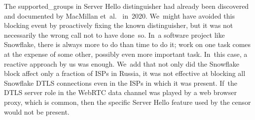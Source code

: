 \documentclass[letterpaper,twocolumn]{article}
\begin{document}
The \mbox{supported\_groups} in Server Hello distinguisher had already been
discovered and documented by MacMillan et~al.~\cite[\S 3]{arxiv.2008.03254} in~2020.
We~might have avoided this blocking event by proactively fixing
the known distinguisher,
but it was not necessarily the wrong call not to have done~so.
In~a software project like Snowflake,
there is always more to do than time to do it;
work on one task comes at the expense of some other,
possibly even more important task.
In~this case, a reactive approach by us was enough.
We~add that not only did the Snowflake block affect
only a fraction of ISPs in Russia,
it was not effective at blocking all Snowflake DTLS connections
even in the ISPs in which it was present.
If~the DTLS server role in the WebRTC data channel
was played by a web browser proxy, which is common,
then the specific Server Hello feature used by the censor
would not be present.

\end{document}

